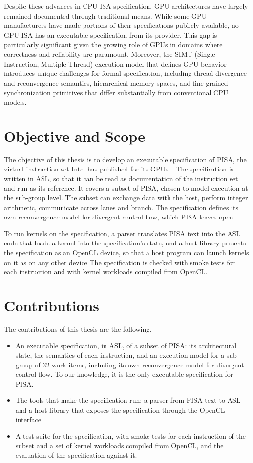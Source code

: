 Despite these advances in CPU ISA specification, GPU architectures have
largely remained documented through traditional means. While some GPU
manufacturers have made portions of their specifications publicly
available, no GPU ISA has an executable specification from its provider.
This gap is particularly significant given the growing role of GPUs in
domains where correctness and reliability are paramount. Moreover, the
SIMT (Single Instruction, Multiple Thread) execution model that defines
GPU behavior introduces unique challenges for formal specification,
including thread divergence and reconvergence semantics, hierarchical
memory spaces, and fine-grained synchronization primitives that differ
substantially from conventional CPU models.

\section{Objective and Scope}

The objective of this thesis is to develop an executable specification of
PISA, the virtual instruction set Intel has published for its
GPUs~\cite{pisa-spec}. The specification is written in ASL, so that it
can be read as documentation of the instruction set and run as its
reference. It covers a subset of PISA, chosen to model execution at the sub-group
level. The subset can exchange data with the host, perform integer
arithmetic, communicate across lanes and branch. The specification
defines its own reconvergence model for divergent control flow, which
PISA leaves open.

To run kernels on the specification, a parser translates PISA text into
the ASL code that loads a kernel into the specification's state, and a
host library presents the specification as an OpenCL device, so that a
host program can launch kernels on it as on any other device The
specification is checked with smoke tests for each instruction and with
kernel workloads compiled from OpenCL.

\section{Contributions}

The contributions of this thesis are the following.

\begin{itemize}
\item An executable specification, in ASL, of a subset of PISA: its
  architectural state, the semantics of each instruction, and an
  execution model for a sub-group of 32 work-items, including
  its own reconvergence model for divergent control flow. To our knowledge, it is
  the only executable specification for PISA.
\item The tools that make the specification run: a parser from PISA text
  to ASL and a host library that exposes the specification through the
  OpenCL interface.
\item A test suite for the specification, with smoke tests for each
  instruction of the subset and a set of kernel workloads compiled from
  OpenCL, and the evaluation of the specification against it.
\end{itemize}

